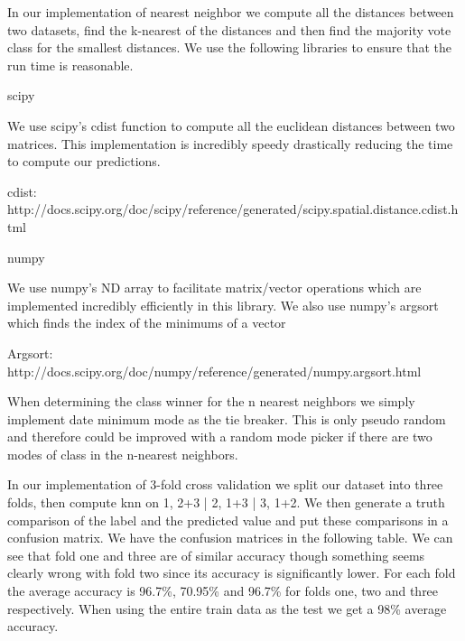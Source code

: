 \documentclass[12pt]{report}
\begin{document}

In our implementation of nearest neighbor we compute all the distances between two datasets, find the k-nearest of the distances and then find the majority vote class for the smallest distances. We use the following libraries to ensure that the run time is reasonable.

scipy

We use scipy's cdist function to compute all the euclidean distances between two matrices. This implementation is incredibly speedy drastically reducing the time to compute our predictions.

cdist: http://docs.scipy.org/doc/scipy/reference/generated/scipy.spatial.distance.cdist.html

numpy

We use numpy's ND array to facilitate matrix/vector operations which are implemented incredibly efficiently in this library. We also use numpy's argsort which finds the index of the minimums of a vector

Argsort: http://docs.scipy.org/doc/numpy/reference/generated/numpy.argsort.html

When determining the class winner for the n nearest neighbors we simply implement date minimum mode as the tie breaker. This is only pseudo random and therefore could be improved with a random mode picker if there are two modes of class in the n-nearest neighbors.



In our implementation of 3-fold cross validation we split our dataset into three folds, then compute knn on 1, 2+3 | 2, 1+3 | 3, 1+2. We then generate a truth comparison of the label and the predicted value and  put these comparisons in a confusion matrix. We have the confusion matrices in the following table. We can see that fold one and three are of similar accuracy though something seems clearly wrong with fold two since its accuracy is significantly lower. For each fold the average accuracy is 96.7\%, 70.95\% and 96.7\% for folds one, two and three respectively. When using the entire train data as the test we get a 98\% average accuracy.
\end{document}
